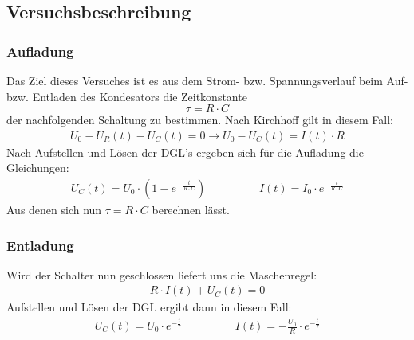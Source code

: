 \documentclass[12pt,a4paper]{article}
\begin{document}
\subsection{Versuchsbeschreibung}
\subsubsection*{Aufladung}
Das Ziel dieses Versuches ist es aus dem Strom- bzw. Spannungsverlauf beim Auf- bzw. Entladen des Kondesators die Zeitkonstante
\[\tau = R \cdot C \]
der nachfolgenden Schaltung zu bestimmen.
Nach Kirchhoff gilt in diesem Fall:
\begin{align*}
U_0-U_R(t)-U_C(t)=0 \rightarrow U_0-U_C(t)=I(t) \cdot R
\end{align*}
Nach Aufstellen und Lösen der DGL's ergeben sich für die Aufladung die Gleichungen:
\begin{align*}
U_C(t)=U_0 \cdot (1-e^{-\frac{t}{R \cdot C}}) \hspace{2cm} I(t)=I_0 \cdot e^{-\frac{t}{R \cdot C}}
\end{align*}
Aus denen sich nun $\tau=R \cdot C$ berechnen lässt.
\subsubsection*{Entladung}
Wird der Schalter nun geschlossen liefert uns die Maschenregel:
\begin{align*}
R \cdot I(t) + U_C(t) = 0
\end{align*}
Aufstellen und Lösen der DGL ergibt dann in diesem Fall:
\begin{align*}
U_C(t)=U_0 \cdot e^{-\frac{t}{\tau}} \hspace{2cm} I(t)=-\frac{U_0}{R} \cdot e^{-\frac{t}{\tau}}
\end{align*}
\end{document}

